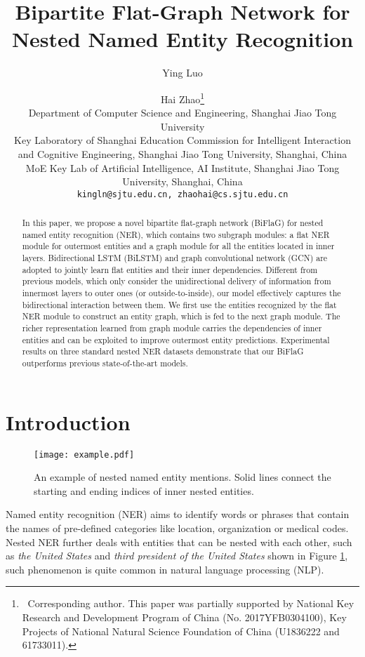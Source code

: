 \documentclass[11pt,a4paper]{article}
\title{Bipartite Flat-Graph Network for Nested Named Entity Recognition}
\author{Ying Luo \and Hai Zhao\thanks{$\ $ Corresponding author. This paper was partially supported by National Key Research and Development Program of China (No. 2017YFB0304100), Key Projects of National Natural Science Foundation of China (U1836222 and 61733011).}\\
Department of Computer Science and Engineering, Shanghai Jiao Tong University \\
Key Laboratory of Shanghai Education Commission for Intelligent Interaction \\ and Cognitive Engineering, Shanghai Jiao Tong University, Shanghai, China\\
MoE Key Lab of Artificial Intelligence, AI Institute, Shanghai Jiao Tong University, Shanghai, China\\
{\tt kingln@sjtu.edu.cn, zhaohai@cs.sjtu.edu.cn}
}
\date{}
\begin{document}
\maketitle
\begin{abstract}

In this paper, we propose a novel bipartite flat-graph network (BiFlaG) for nested named entity recognition (NER), which contains two subgraph modules: a flat NER module for outermost entities and a graph module for all the entities located in inner layers.
Bidirectional LSTM (BiLSTM) and graph convolutional network (GCN) are adopted to
jointly learn flat entities and their inner dependencies.
Different from previous models, which only consider the unidirectional delivery of information from innermost layers to outer ones (or outside-to-inside), our model effectively captures the bidirectional interaction between them. 
We first use the entities recognized by the flat NER module to construct an entity graph, which is fed to the next graph module. 
The richer representation learned from graph module carries the dependencies of inner entities and can be exploited to improve outermost entity predictions.
Experimental results on three standard nested NER datasets demonstrate that our BiFlaG outperforms previous state-of-the-art models.

\end{abstract}


\section{Introduction}

\begin{figure}[!t]
  \centering 
  \texttt{[image: example.pdf]}
    \caption{An example of nested named entity mentions. Solid lines connect the starting and ending indices of inner nested entities.}\label{example}
\end{figure} 

Named entity recognition (NER) aims to identify words or phrases that contain the names of pre-defined categories like location, organization or medical codes. Nested NER further deals with entities that can be nested with each other, such as \textit{the United States} and \textit{third president of the United States} shown in Figure \ref{example}, such phenomenon is quite common in natural language processing (NLP). 
\end{document}
